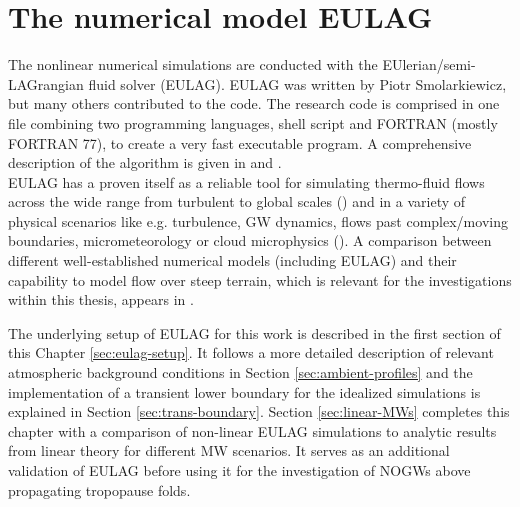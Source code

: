 \chapter{The numerical model EULAG}
\label{sec:EULAG}
The nonlinear numerical simulations are conducted with the EUlerian/semi- LAGrangian fluid solver (EULAG). EULAG was written by Piotr Smolarkiewicz, but many others contributed to the code. The research code is comprised in one file combining two programming languages, shell script and FORTRAN (mostly FORTRAN 77), to create a very fast executable program. A comprehensive description of the algorithm is given in \textcite[]{smolarkiewicz_forward--time_1997} and \textcite[]{smolarkiewicz_mpdata_1998}. \\
EULAG has a proven itself as a reliable tool for simulating thermo-fluid flows across the wide range from turbulent to global scales (\cite{prusa_all-scale_2003}) and in a variety of physical scenarios like e.g. turbulence, GW dynamics, flows past complex/moving boundaries, micrometeorology or cloud microphysics (\cite{prusa_eulag_2008}). A comparison between different well-established numerical models (including EULAG) and their capability to model flow over steep terrain, which is relevant for the investigations within this thesis, appears in \textcite{doyle_intercomparison_2011}.

The underlying setup of EULAG for this work is described in the first section of this Chapter \ref{sec:eulag-setup}. It follows a more detailed description of relevant atmospheric background conditions in Section \ref{sec:ambient-profiles} and the implementation of a transient lower boundary for the idealized simulations is explained in Section \ref{sec:trans-boundary}. Section \ref{sec:linear-MWs} completes this chapter with a comparison of non-linear EULAG simulations to analytic results from linear theory for different MW scenarios. It serves as an additional validation of EULAG before using it for the investigation of NOGWs above propagating tropopause folds.

